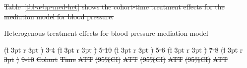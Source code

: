 \documentclass[
  letterpaper,
  DIV=11,
  numbers=noendperiod]{scrartcl}
\makeatletter
\renewenvironment{table}%
   {\renewcommand\familydefault\sfdefault
    \@float{table}}
   {\end@float}
\providecommand{\DIFdeltex}[1]{{\protect\color{red}\sout{#1}}}                      %
\providecommand{\DIFdelFL}[1]{\DIFdel{#1}} %
\providecommand{\DIFdel}[1]{\texorpdfstring{\DIFdeltex{#1}}{}} %
\makeatother
\begin{document}
\DIFdel{Table~\ref{tbl-a-bp-med-het} shows the cohort-time treatment effects for
the mediation model for blood pressure.
}%

{%
\DIFdelFL{Heterogenous treatment effects for blood pressure mediation model }}%


\DIFdelFL{(l}%
\DIFdelFL{3pt}%
\DIFdelFL{r}%
\DIFdelFL{3pt}%
\DIFdelFL{)}%
\DIFdelFL{3-4}%
\DIFdelFL{(l}%
\DIFdelFL{3pt}%
\DIFdelFL{r}%
\DIFdelFL{3pt}%
\DIFdelFL{)}%
\DIFdelFL{5-10}%
\DIFdelFL{(l}%
\DIFdelFL{3pt}%
\DIFdelFL{r}%
\DIFdelFL{3pt}%
\DIFdelFL{)}%
\DIFdelFL{5-6}%
\DIFdelFL{(l}%
\DIFdelFL{3pt}%
\DIFdelFL{r}%
\DIFdelFL{3pt}%
\DIFdelFL{)}%
\DIFdelFL{7-8}%
\DIFdelFL{(l}%
\DIFdelFL{3pt}%
\DIFdelFL{r}%
\DIFdelFL{3pt}%
\DIFdelFL{)}%
\DIFdelFL{9-10}%
\DIFdelFL{Cohort }%
\DIFdelFL{Time }%
\DIFdelFL{ATT }%
\DIFdelFL{(95\%CI) }%
\DIFdelFL{ATT }%
\DIFdelFL{(95\%CI) }%
\DIFdelFL{ATT }%
\DIFdelFL{(95\%CI) }%
\DIFdelFL{ATT }%
\end{document}
